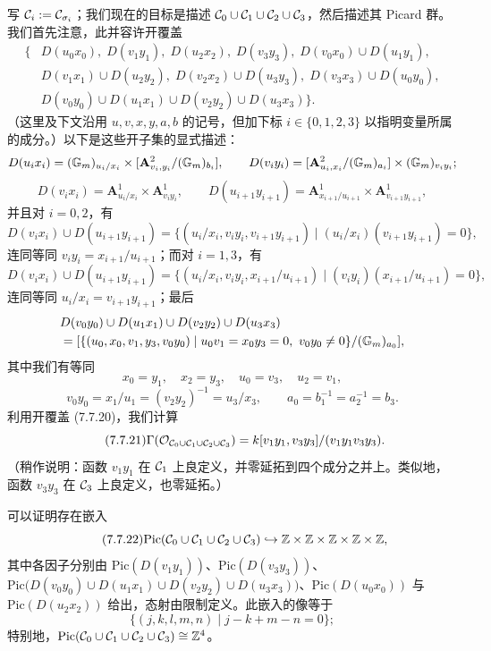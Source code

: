 写 $\mathcal{C}_i:=\mathcal{C}_{\sigma_i}$；我们现在的目标是描述 $\mathcal{C}_0\cup\mathcal{C}_1\cup\mathcal{C}_2\cup\mathcal{C}_3$，然后描述其 Picard 群。我们首先注意，此并容许开覆盖
\begin{equation}\tag{7.7.20}\label{eq:a4-7-7-20}
\begin{aligned}
\{&D(u_0x_0),\;D(v_1y_1),\;D(u_2x_2),\;D(v_3y_3),\;D(v_0x_0)\cup D(u_1y_1),\\
&D(v_1x_1)\cup D(u_2y_2),\;D(v_2x_2)\cup D(u_3y_3),\;D(v_3x_3)\cup D(u_0y_0),\\
&D(v_0y_0)\cup D(u_1x_1)\cup D(v_2y_2)\cup D(u_3x_3)\}.
\end{aligned}
\end{equation}
（这里及下文沿用 $u,v,x,y,a,b$ 的记号，但加下标 $i\in\{0,1,2,3\}$ 以指明变量所属的成分。）以下是这些开子集的显式描述：
\[
D(u_ix_i)=(\mathbb{G}_m)_{u_i/x_i}\times[\mathbf A^2_{v_i,y_i}/(\mathbb{G}_m)_{b_i}],\qquad
D(v_iy_i)=[\mathbf A^2_{u_i,x_i}/(\mathbb{G}_m)_{a_i}]\times(\mathbb{G}_m)_{v_iy_i};
\]
\[
D(v_ix_i)=\mathbf A^1_{u_i/x_i}\times\mathbf A^1_{v_iy_i},\qquad
D(u_{i+1}y_{i+1})=\mathbf A^1_{x_{i+1}/u_{i+1}}\times\mathbf A^1_{v_{i+1}y_{i+1}},
\]
并且对 $i=0,2$，有
\[
D(v_ix_i)\cup D(u_{i+1}y_{i+1})=\{(u_i/x_i,v_iy_i,v_{i+1}y_{i+1})\mid (u_i/x_i)(v_{i+1}y_{i+1})=0\},
\]
连同等同 $v_iy_i=x_{i+1}/u_{i+1}$；而对 $i=1,3$，有
\[
D(v_ix_i)\cup D(u_{i+1}y_{i+1})=\{(u_i/x_i,v_iy_i,x_{i+1}/u_{i+1})\mid (v_iy_i)(x_{i+1}/u_{i+1})=0\},
\]
连同等同 $u_i/x_i=v_{i+1}y_{i+1}$；最后
\[
\begin{aligned}
& D(v_0y_0)\cup D(u_1x_1)\cup D(v_2y_2)\cup D(u_3x_3)\\
&=[\{(u_0,x_0,v_1,y_3,v_0y_0)\mid u_0v_1=x_0y_3=0,\ v_0y_0\neq0\}/(\GG_m)_{a_0}],
\end{aligned}
\]
其中我们有等同
\[
x_0=y_1,\quad x_2=y_3,\quad u_0=v_3,\quad u_2=v_1,
\]
\[
v_0y_0=x_1/u_1=(v_2y_2)^{-1}=u_3/x_3,\qquad a_0=b_1^{-1}=a_2^{-1}=b_3.
\]
利用开覆盖 (7.7.20)，我们计算
\begin{equation}\tag{7.7.21}\label{eq:a4-7-7-21}
\Gamma(\mathcal{O}_{\mathcal{C}_0\cup\mathcal{C}_1\cup\mathcal{C}_2\cup\mathcal{C}_3})=k[v_1y_1,v_3y_3]/(v_1y_1v_3y_3).
\end{equation}
（稍作说明：函数 $v_1y_1$ 在 $\mathcal{C}_1$ 上良定义，并零延拓到四个成分之并上。类似地，函数 $v_3y_3$ 在 $\mathcal{C}_3$ 上良定义，也零延拓。）

可以证明存在嵌入
\begin{equation}\tag{7.7.22}\label{eq:a4-7-7-22}
\mathrm{Pic}(\mathcal{C}_0\cup\mathcal{C}_1\cup\mathcal{C}_2\cup\mathcal{C}_3)\hookrightarrow\mathbb{Z}\times\mathbb{Z}\times\mathbb{Z}\times\mathbb{Z}\times\mathbb{Z},
\end{equation}
其中各因子分别由 $\mathrm{Pic}(D(v_1y_1))$、$\mathrm{Pic}(D(v_3y_3))$、$\mathrm{Pic}\bigl(D(v_0y_0)\cup D(u_1x_1)\cup D(v_2y_2)\cup D(u_3x_3)\bigr)$、$\mathrm{Pic}(D(u_0x_0))$ 与 $\mathrm{Pic}(D(u_2x_2))$ 给出，态射由限制定义。此嵌入的像等于
\begin{equation}\tag{7.7.23}\label{eq:a4-7-7-23}
\{(j,k,l,m,n)\mid j-k+m-n=0\};
\end{equation}
特别地，$\mathrm{Pic}(\mathcal{C}_0\cup\mathcal{C}_1\cup\mathcal{C}_2\cup\mathcal{C}_3)\cong\mathbb{Z}^4$。

